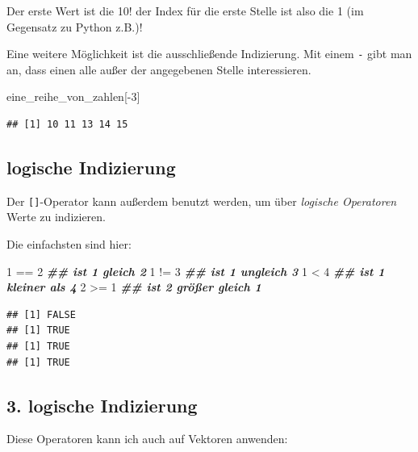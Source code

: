 \documentclass[
]{book}
\newenvironment{Shaded}{\begin{snugshade}}{\end{snugshade}}
\newcommand{\DecValTok}[1]{\textcolor[rgb]{0.00,0.00,0.81}{#1}}
\newcommand{\DocumentationTok}[1]{\textcolor[rgb]{0.56,0.35,0.01}{\textbf{\textit{#1}}}}
\newcommand{\NormalTok}[1]{#1}
\newcommand{\SpecialCharTok}[1]{\textcolor[rgb]{0.00,0.00,0.00}{#1}}
\begin{document}
Der erste Wert ist die 10! der Index für die erste Stelle ist also die 1 (im Gegensatz zu Python z.B.)!

Eine weitere Möglichkeit ist die ausschließende Indizierung. Mit einem \texttt{-} gibt man an, dass einen alle außer der angegebenen Stelle interessieren.

\begin{Shaded}
\begin{Highlighting}[]
\NormalTok{eine\_reihe\_von\_zahlen[}\SpecialCharTok{{-}}\DecValTok{3}\NormalTok{]}
\end{Highlighting}
\end{Shaded}

\begin{verbatim}
## [1] 10 11 13 14 15
\end{verbatim}

\hypertarget{logische-indizierung}{%
\subsection{logische Indizierung}\label{logische-indizierung}}

Der \texttt{{[}{]}}-Operator kann außerdem benutzt werden, um über \emph{logische Operatoren} Werte zu indizieren.

Die einfachsten sind hier:

\begin{Shaded}
\begin{Highlighting}[]
\DecValTok{1} \SpecialCharTok{==} \DecValTok{2} \DocumentationTok{\#\# ist 1 gleich 2}
\DecValTok{1} \SpecialCharTok{!=} \DecValTok{3} \DocumentationTok{\#\# ist 1 ungleich 3}
\DecValTok{1} \SpecialCharTok{\textless{}} \DecValTok{4}  \DocumentationTok{\#\# ist 1 kleiner als 4}
\DecValTok{2} \SpecialCharTok{\textgreater{}=} \DecValTok{1} \DocumentationTok{\#\# ist 2 größer gleich 1}
\end{Highlighting}
\end{Shaded}

\begin{verbatim}
## [1] FALSE
## [1] TRUE
## [1] TRUE
## [1] TRUE
\end{verbatim}

\hypertarget{logische-indizierung-1}{%
\subsection{3. logische Indizierung}\label{logische-indizierung-1}}

Diese Operatoren kann ich auch auf Vektoren anwenden:
\end{document}
